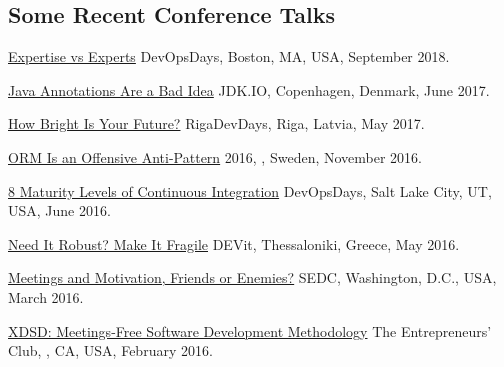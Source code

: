 \documentclass{yb}
\begin{document}
\subsection*{Some Recent Conference Talks}

\begin{samepage}
\href{https://youtu.be/KCx1o_lSMkI}{Expertise vs Experts}\newline
DevOpsDays, Boston, MA, USA, September 2018.
\end{samepage}

\begin{samepage}
\href{https://youtu.be/cv23Z6xpwDw}{Java Annotations Are a Bad Idea}\newline
JDK.IO, Copenhagen, Denmark, June 2017.
\end{samepage}

\begin{samepage}
\href{https://www.youtube.com/watch?v=IGbteQpTNCA}{How Bright Is Your Future?}\newline
RigaDevDays, Riga, Latvia, May 2017.
\end{samepage}

\begin{samepage}
\href{https://www.youtube.com/watch?v=03PXmPc7Q3g}{ORM Is an Offensive Anti-Pattern}\newline
{} 2016, , Sweden, November 2016.
\end{samepage}

\begin{samepage}
\href{https://www.youtube.com/watch?v=3dJP_LtUGgg}{8 Maturity Levels of Continuous Integration}\newline
DevOpsDays, Salt Lake City, UT, USA, June 2016.
\end{samepage}

\begin{samepage}
\href{https://www.youtube.com/watch?v=nCGBgI1MNwE}{Need It Robust? Make It Fragile}\newline
DEVit, Thessaloniki, Greece, May 2016.
\end{samepage}

\begin{samepage}
\href{https://www.youtube.com/watch?v=LB_YLWhGrco}{Meetings and Motivation, Friends or Enemies?}\newline
SEDC, Washington, D.C., USA, March 2016.
\end{samepage}

\begin{samepage}
\href{https://www.youtube.com/watch?v=qRZYJGYdrwk}{XDSD: Meetings-Free Software Development Methodology}\newline
The Entrepreneurs' Club, , CA, USA, February 2016.
\end{samepage}
\end{document}
